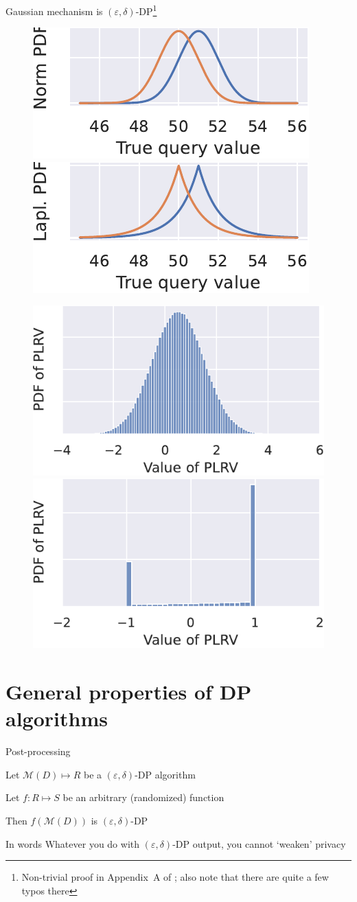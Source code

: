 \documentclass[12pt,aspectratio=169,handout]{beamer}
\begin{document}
\begin{frame}{Gaussian mechanism is $(\varepsilon, \delta)$-DP\footnote{Non-trivial proof in Appendix~A of \citet{Dwork.Roth.2013}; also note that there are quite a few typos there}}

\begin{figure}
\centering
\includegraphics[width=0.45\linewidth]{img/gaussian-pdfs-01.pdf}
\includegraphics[width=0.45\linewidth]{img/laplace-pdfs-01.pdf}
\end{figure}


\begin{figure}
\centering
\includegraphics[width=0.45\linewidth]{img/loss2.pdf}
\includegraphics[width=0.45\linewidth]{img/loss1.pdf}
\end{figure}

\end{frame}

\section{General properties of DP algorithms}


\begin{frame}{Post-processing}

Let $\mathcal{M}(D) \mapsto R$ be a $(\varepsilon, \delta)$-DP algorithm

Let $f: R \mapsto S$ be an arbitrary (randomized) function

Then $f(\mathcal{M}(D))$ is $(\varepsilon, \delta)$-DP

\begin{block}{In words}
Whatever you do with $(\varepsilon, \delta)$-DP output, you cannot `weaken' privacy
\end{block}


\end{frame}
\end{document}
